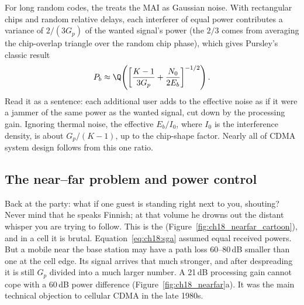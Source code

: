 For long random codes, the  treats the MAI as Gaussian
noise. With rectangular chips and random relative delays, each interferer of equal power
contributes a variance of $2/(3G_p)$ of the wanted signal's power (the $2/3$ comes from
averaging the chip-overlap triangle over the random chip phase), which gives Pursley's
classic result
\begin{equation}
P_b\approx\Q\!\left(\left[\frac{K-1}{3G_p}+\frac{N_0}{2E_b}\right]^{-1/2}\right).
\label{eq:ch18:sga}
\end{equation}
Read it as a sentence: each additional user adds to the effective noise as if it were a jammer of
the same power as the wanted signal, cut down by the processing gain. Ignoring thermal noise, the
effective $E_b/I_0$, where $I_0$ is the interference density, is about $G_p/(K-1)$, up to the
chip-shape factor. Nearly all of CDMA system design follows from this one ratio.



\subsection{The near--far problem and power control}

Back at the party: what if one guest is standing right next to you, shouting? Never mind that he
speaks Finnish; at that volume he drowns out the distant whisper you are trying to follow. This
is the  (Figure~\ref{fig:ch18_nearfar_cartoon}), and in a cell it is
brutal. Equation~\eqref{eq:ch18:sga} assumed equal received powers. But a mobile near the
base station may have a path loss 60--80\,dB smaller than one at the cell edge. Its signal
arrives that much stronger, and after despreading it is still $G_p$ divided into a
much larger number. A 21\,dB processing gain cannot cope with a 60\,dB power difference
(Figure~\ref{fig:ch18_nearfar}a). It was the main technical objection to cellular CDMA in the
late 1980s.

